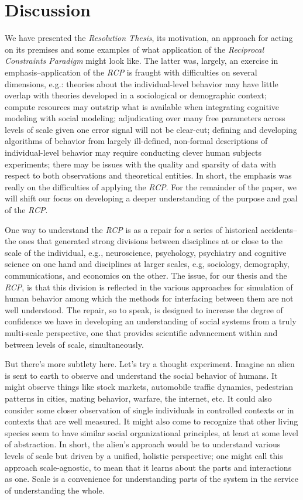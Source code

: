 \documentclass{article}
\begin{document}
\section{Discussion}
We have presented the \textit{Resolution Thesis}, its motivation, an approach for acting on its premises and some examples of what application of the \textit{Reciprocal Constraints Paradigm} might look like.  The latter was, largely, an exercise in emphasis--application of the \textit{RCP} is fraught with difficulties on several dimensions, e.g.:  theories about the individual-level behavior may have little overlap with theories developed in a sociological or demographic context; compute resources may outstrip what is available when integrating cognitive modeling with social modeling; adjudicating over many free parameters across levels of scale given one error signal will not be clear-cut; defining and developing algorithms of behavior from largely ill-defined, non-formal descriptions of individual-level behavior may require conducting clever human subjects experiments; there may be issues with the quality and sparsity of data with respect to both observations and theoretical entities.  In short, the emphasis was really on the difficulties of applying the \textit{RCP}.  For the remainder of the paper, we will shift our focus on developing a deeper understanding of the purpose and goal of the \textit{RCP}.
  
One way to understand the \textit{RCP} is as a repair for a series of historical accidents--the ones that generated strong divisions between disciplines at or close to the scale of the individual, e.g.,  neuroscience, psychology, psychiatry and cognitive science on one hand and disciplines at larger scales, e.g, sociology, demography, communications, and economics on the other.  The issue, for our thesis and the \textit{RCP}, is that this division is reflected in the various approaches for simulation of human behavior among which the methods for interfacing between them are not well understood.  The repair, so to speak, is designed to increase the degree of confidence we have in developing an understanding of social systems from a truly multi-scale perspective, one that provides scientific advancement within and between levels of scale, simultaneously. 

But there's more subtlety here.  Let's try a thought experiment.  Imagine an alien is sent to earth to observe and understand the social behavior of humans.  It might observe things like stock markets, automobile traffic dynamics, pedestrian patterns in cities, mating behavior, warfare, the internet, etc.  It could also consider some closer observation of single individuals in controlled contexts or in contexts that are well measured. It might also come to recognize that other living species seem to have similar social organizational principles, at least at some level of abstraction.  In short, the alien's approach would be to understand various levels of scale but driven by a unified, holistic perspective; one might call this approach scale-agnostic, to mean that it learns about the parts and interactions as one.  Scale is a convenience for understanding parts of the system in the service of understanding the whole. 
\end{document}

